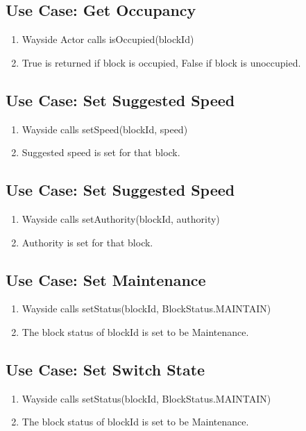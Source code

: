 \documentclass{scrreprt}
\begin{document}
\subsection{Use Case: Get Occupancy}
\begin{enumerate}
	\item Wayside Actor calls isOccupied(blockId)
	\item True is returned if block is occupied, False if block is unoccupied.
\end{enumerate}

\subsection{Use Case: Set Suggested Speed}
\begin{enumerate}
	\item Wayside calls setSpeed(blockId, speed)
	\item Suggested speed is set for that block.
\end{enumerate}

\subsection{Use Case: Set Suggested Speed}
\begin{enumerate}
	\item Wayside calls setAuthority(blockId, authority)
	\item Authority is set for that block.
\end{enumerate}

\subsection{Use Case: Set Maintenance}
\begin{enumerate}
	\item Wayside calls setStatus(blockId, BlockStatus.MAINTAIN)
	\item The block status of blockId is set to be Maintenance.
\end{enumerate}

\subsection{Use Case: Set Switch State}
\begin{enumerate}
	\item Wayside calls setStatus(blockId, BlockStatus.MAINTAIN)
	\item The block status of blockId is set to be Maintenance.
\end{enumerate}
\end{document}

